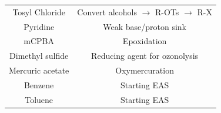\documentclass[10pt,landscape]{article}
\begin{document}
\begin{multicols*}{3}
\begin{scriptsize}
\begin{itemize}
\begin{tabular}{c|c}
        Tosyl Chloride & Convert alcohols $\rightarrow$ R-OTs $\rightarrow$ R-X\\
        Pyridine & Weak base/proton sink\\
        mCPBA & Epoxidation\\
        Dimethyl sulfide & Reducing agent for ozonolysis\\
        Mercuric acetate & Oxymercuration\\
        Benzene & Starting EAS \\
        Toluene & Starting EAS \\
      \end{tabular}
    \end{itemize}
  \end{scriptsize}
\end{multicols*}
\end{document}
